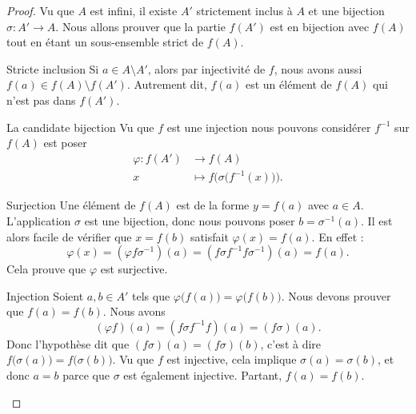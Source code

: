 \begin{proof}
    Vu que \( A\) est infini, il existe \( A'\) strictement inclus à \( A\) et une bijection \( \sigma\colon A'\to A\). Nous allons prouver que la partie \( f(A')\) est en bijection avec \( f(A)\) tout en étant un sous-ensemble strict de \( f(A)\).

    \begin{subproof}
        \item[Stricte inclusion]
            Si \( a\in A\setminus A'\), alors par injectivité de \( f\), nous avons aussi \( f(a)\in f(A)\setminus f(A')\). Autrement dit, \( f(a)\) est un élément de \( f(A)\) qui n'est pas dans \( f(A')\).
        \item[La candidate bijection]
            Vu que \( f\) est une injection nous pouvons considérer \( f^{-1}\) sur \( f(A)\) est poser
            \begin{equation}
                \begin{aligned}
                    \varphi\colon f(A')&\to f(A) \\
                    x&\mapsto  f\Big( \sigma\big( f^{-1}(x) \big) \Big).
                \end{aligned}
            \end{equation}
        \item[Surjection]
            Une élément de \( f(A)\) est de la forme \( y=f(a)\) avec \( a\in A\). L'application \( \sigma\) est une bijection, donc nous pouvons poser \( b=\sigma^{-1}(a)\). Il est alors facile de vérifier que \( x=f(b)\) satisfait \( \varphi(x)=f(a)\). En effet :
            \begin{equation}
                \varphi(x)=(\varphi f\sigma^{-1})(a)=(f\sigma f^{-1}f\sigma^{-1})(a)=f(a).
            \end{equation}
            Cela prouve que \( \varphi\) est surjective.
        \item[Injection]
            Soient \( a,b\in A'\) tels que \( \varphi\big( f(a) \big)=\varphi\big( f(b) \big)\). Nous devons prouver que \( f(a)=f(b)\). Nous avons
            \begin{equation}
                (\varphi f)(a)=(f\sigma f^{-1} f)(a)=(f\sigma)(a).
            \end{equation}
            Donc l'hypothèse dit que \( (f\sigma)(a)=(f\sigma)(b)\), c'est à dire \( f\big( \sigma(a) \big)=f\big( \sigma(b) \big)\). Vu que \( f\) est injective, cela implique \( \sigma(a)=\sigma(b)\), et donc \( a=b\) parce que \( \sigma\) est également injective. Partant, \( f(a)=f(b)\).
    \end{subproof}
\end{proof}

